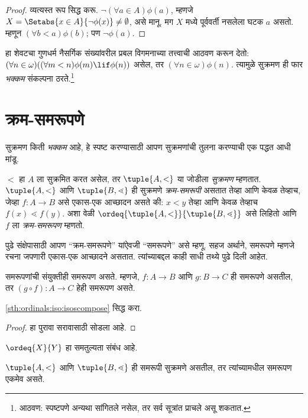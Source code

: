 \begin{proof}
व्यत्यस्त रूप सिद्ध करू. $\lnot(\forall a \in
A)\phi(a)$, म्हणजे $X = \Setabs{x \in A}{\lnot\phi(x)} \neq
\emptyset$, असे मानू. मग $X$ मध्ये पूर्ववर्ती नसलेला घटक $a$ असतो. म्हणून $(\forall
b < a)\phi(b)$; पण $\lnot \phi(a)$.
\end{proof}\noindent हा शेवटचा गुणधर्म नैसर्गिक संख्यांवरील प्रबल विगमनाच्या तत्त्वाची आठवण करून देतो: $(\forall n \in \omega)((\forall m < n)\phi(m)
\lif \phi(n))$ असेल, तर $(\forall n \in \omega)\phi(n)$. त्यामुळे सुक्रमण ही फार \emph{भक्कम} संकल्पना ठरते.\footnote{आठवण: स्पष्टपणे अन्यथा सांगितले नसेल, तर सर्व सूत्रांत प्राचले असू शकतात.}








\section{क्रम-समरूपणे}\label{sth:ordinals:iso:sec}

सुक्रमण किती \emph{भक्कम} आहे, हे स्पष्ट करण्यासाठी आपण सुक्रमणांची तुलना करण्याची एक पद्धत आधी मांडू.

\begin{defn}
$<$ हा $A$ ला सुक्रमित करत असेल, तर $\tuple{A, <}$ या जोडीला \emph{सुक्रमण} म्हणतात. $\tuple{A, <}$ आणि $\tuple{B,
\lessdot}$ ही सुक्रमणे \emph{क्रम-समरूपी} असतात तेव्हा आणि केवळ तेव्हाच, जेव्हा $f \colon A \to B$ असे एकास-एक आच्छादन असते की: $x < y$ तेव्हा आणि केवळ तेव्हाच $f(x) \lessdot  f(y)$. अशा वेळी $\ordeq{\tuple{A, <}}{\tuple{B, \lessdot}}$ असे लिहितो आणि $f$ ला \emph{क्रम-समरूपण} म्हणतो.
\end{defn}
\noindent
पुढे संक्षेपासाठी आपण ``क्रम-समरूपणे'' यांऐवजी ``समरूपणे'' असे म्हणू. सहज अर्थाने, समरूपणे म्हणजे रचना जपणारी एकास-एक आच्छादने असतात. त्यांच्याबद्दल काही साधी तथ्ये पुढे दिली आहेत.

\begin{lem}\label{sth:ordinals:iso:isoscompose}
समरूपणांची संयुक्तीही समरूपण असते. म्हणजे, $f \colon A
\to B$ आणि $g \colon B \to C$ ही समरूपणे असतील, तर $(g \circ f)
\colon A \to C$ हेही समरूपण असते.
\end{lem}
\begin{prob}
	\ref{sth:ordinals:iso:isoscompose} सिद्ध करा.
\end{prob}
\begin{proof}
हा पुरावा सरावासाठी सोडला आहे.
\end{proof}
\begin{cor}\label{sth:ordinals:iso:ordisoisequiv}
	$\ordeq{X}{Y}$ हा समतुल्यता संबंध आहे.
\end{cor}
\begin{prop}\label{sth:ordinals:iso:ordisounique}
$\tuple{A, <}$ आणि $\tuple{B, \lessdot}$ ही समरूपी सुक्रमणे असतील, तर त्यांच्यामधील समरूपण एकमेव असते.
\end{prop}

